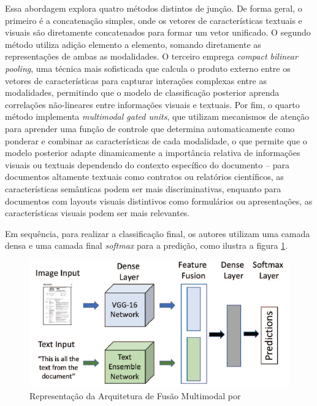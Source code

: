 Essa abordagem explora quatro métodos distintos de junção. De forma geral, o primeiro é a concatenação simples, onde os vetores de características textuais e visuais são diretamente concatenados para formar um vetor unificado. O segundo método utiliza adição elemento a elemento, somando diretamente as representações de ambas as modalidades. O terceiro emprega \textit{compact bilinear pooling}, uma técnica mais sofisticada que calcula o produto externo entre os vetores de características para capturar interações complexas entre as modalidades, permitindo que o modelo de classificação posterior aprenda correlações não-lineares entre informações visuais e textuais. Por fim, o quarto método implementa \textit{multimodal gated units}, que utilizam mecanismos de atenção para aprender uma função de controle que determina automaticamente como ponderar e combinar as características de cada modalidade, o que permite que o modelo posterior adapte dinamicamente a importância relativa de informações visuais ou textuais dependendo do contexto específico do documento -- para documentos altamente textuais como contratos ou relatórios científicos, as características semânticas podem ser mais discriminativas, enquanto para documentos com layouts visuais distintivos como formulários ou apresentações, as características visuais podem ser mais relevantes.

Em sequência, para realizar a classificação final, os autores utilizam uma camada densa e uma camada final \textit{softmax} para a predição, como ilustra a figura \ref{fig:multimodal}.

\begin{figure}[H]
	\caption{\label{fig:multimodal}Representação da Arquitetura de Fusão Multimodal por \citeauthor*{multimodal}}
    \begin{center}
    \includegraphics[width=1\linewidth]{images/multimodal.png}
	\end{center}
\end{figure}

